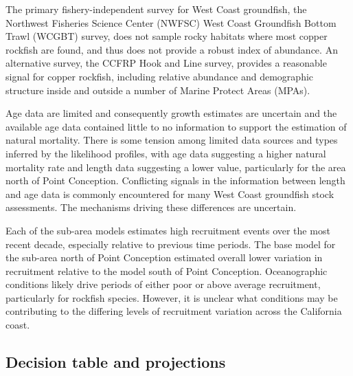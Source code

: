 \documentclass[11pt,
  letterpaper,
]{article}
\begin{document}
The primary fishery-independent survey for West Coast groundfish, the Northwest Fisheries Science Center (NWFSC) West Coast Groundfish Bottom Trawl (WCGBT) survey, does not sample rocky habitats where most copper rockfish are found, and thus does not provide a robust index of abundance. An alternative survey, the CCFRP Hook and Line survey, provides a reasonable signal for copper rockfish, including relative abundance and demographic structure inside and outside a number of Marine Protect Areas (MPAs).

Age data are limited and consequently growth estimates are uncertain and the available age data contained little to no information to support the estimation of natural mortality. There is some tension among limited data sources and types inferred by the likelihood profiles, with age data suggesting a higher natural mortality rate and length data suggesting a lower value, particularly for the area north of Point Conception. Conflicting signals in the information between length and age data is commonly encountered for many West Coast groundfish stock assessments. The mechanisms driving these differences are uncertain.

Each of the sub-area models estimates high recruitment events over the most recent decade, especially relative to previous time periods. The base model for the sub-area north of Point Conception estimated overall lower variation in recruitment relative to the model south of Point Conception. Oceanographic conditions likely drive periods of either poor or above average recruitment, particularly for rockfish species. However, it is unclear what conditions may be contributing to the differing levels of recruitment variation across the California coast.

\subsection*{Decision table and projections}\label{decision-table-and-projections}
\end{document}
